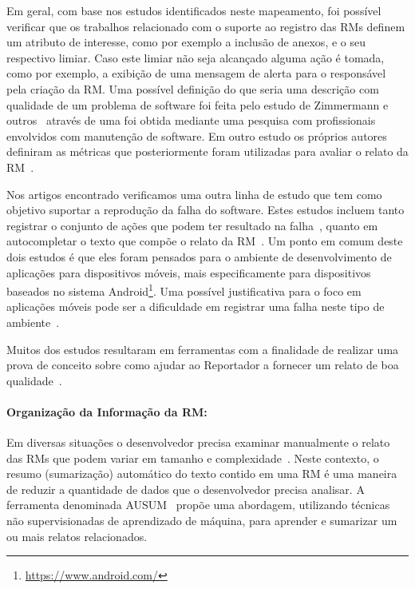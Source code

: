 Em geral, com base nos estudos identificados neste mapeamento, foi possível
verificar que os trabalhos relacionado com o suporte ao registro das RMs
definem um atributo de interesse, como por exemplo a inclusão de anexos, e o
seu respectivo limiar. Caso este limiar não seja alcançado alguma ação é
tomada, como por exemplo, a exibição de uma mensagem de alerta para o
responsável pela criação da RM\@. Uma possível definição do que seria uma
descrição com qualidade de um problema de software foi feita pelo estudo de
Zimmermann e outros~\cite{zimmermann2010makes} através de uma foi obtida mediante uma
pesquisa com profissionais envolvidos com manutenção de software. Em outro
estudo os próprios autores definiram as métricas que posteriormente foram
utilizadas para avaliar o relato da RM~\cite{Tu:2014:MQI:2677832.2677844}.

Nos artigos encontrado verificamos uma outra linha de estudo que tem como
objetivo suportar a reprodução da falha do software. Estes estudos incluem
tanto registrar o conjunto de ações que podem ter resultado na
falha~\cite{White:2015:GRR:2820282.2820291}, quanto em autocompletar o texto
que compõe o relato da RM~\cite{moran2015auto}. Um ponto em comum deste dois
estudos é que eles foram pensados para o ambiente de desenvolvimento de
aplicações para dispositivos móveis, mais especificamente para dispositivos
baseados no sistema Android\footnote{\url{https://www.android.com/}}. Uma
possível justificativa para o foco em aplicações móveis pode ser a dificuldade
em registrar uma falha neste tipo de
ambiente~\cite{White:2015:GRR:2820282.2820291, moran2015auto}.

Muitos dos estudos resultaram em ferramentas com a finalidade de realizar uma
prova de conceito sobre como ajudar ao Reportador a fornecer um relato de boa
qualidade~\cite{Tu:2014:MQI:2677832.2677844, zimmermann2010makes,
    Wu2011a,White:2015:GRR:2820282.2820291,moran2015auto}.

\paragraph{Organização da Informação da RM:}

Em diversas situações o desenvolvedor precisa examinar manualmente o relato das
RMs que podem variar em tamanho e complexidade~\cite{mani2012ausum}. Neste
contexto, o resumo (sumarização) automático do texto contido em uma RM é uma
maneira de reduzir a quantidade de dados que o desenvolvedor precisa analisar.
A ferramenta denominada AUSUM~\cite{mani2012ausum} propõe uma abordagem,
utilizando técnicas não supervisionadas de aprendizado de máquina, para aprender
e sumarizar um ou mais relatos relacionados.


